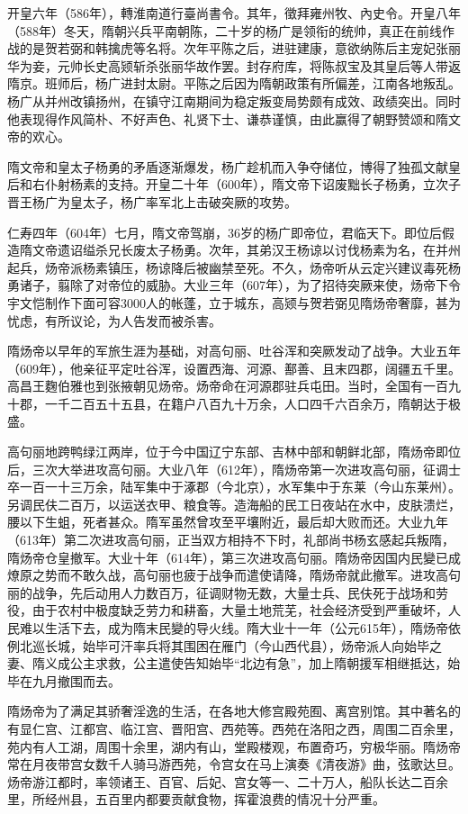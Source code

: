 开皇六年（586年），轉淮南道行臺尚書令。其年，徵拜雍州牧、內史令。开皇八年（588年）冬天，隋朝兴兵平南朝陈，二十岁的杨广是领衔的统帅，真正在前线作战的是贺若弼和韩擒虎等名将。次年平陈之后，进驻建康，意欲纳陈后主宠妃张丽华为妾，元帅长史高颎斩杀张丽华故作罢。封存府库，将陈叔宝及其皇后等人带返隋京。班师后，杨广进封太尉。平陈之后因为隋朝政策有所偏差，江南各地叛乱。杨广从并州改镇扬州，在镇守江南期间为稳定叛变局势颇有成效、政绩突出。同时他表现得作风简朴、不好声色、礼贤下士、谦恭谨慎，由此赢得了朝野赞颂和隋文帝的欢心。

隋文帝和皇太子杨勇的矛盾逐渐爆发，杨广趁机而入争夺储位，博得了独孤文献皇后和右仆射杨素的支持。开皇二十年（600年），隋文帝下诏废黜长子杨勇，立次子晋王杨广为皇太子，杨广率军北上击破突厥的攻势。

仁寿四年（604年）七月，隋文帝驾崩，36岁的杨广即帝位，君临天下。即位后假造隋文帝遗诏缢杀兄长废太子杨勇。次年，其弟汉王杨谅以讨伐杨素为名，在并州起兵，炀帝派杨素镇压，杨谅降后被幽禁至死。不久，炀帝听从云定兴建议毒死杨勇诸子，翦除了对帝位的威胁。大业三年（607年），为了招待突厥来使，炀帝下令宇文恺制作下面可容3000人的帐蓬，立于城东，高颎与贺若弼见隋炀帝奢靡，甚为忧虑，有所议论，为人告发而被杀害。

隋炀帝以早年的军旅生涯为基础，对高句丽、吐谷浑和突厥发动了战争。大业五年（609年），他亲征平定吐谷浑，设置西海、河源、鄯善、且末四郡，阔疆五千里。高昌王麴伯雅也到张掖朝见炀帝。炀帝命在河源郡驻兵屯田。当时，全国有一百九十郡，一千二百五十五县，在籍户八百九十万余，人口四千六百余万，隋朝达于极盛。

高句丽地跨鸭绿江两岸，位于今中国辽宁东部、吉林中部和朝鲜北部，隋炀帝即位后，三次大举进攻高句丽。大业八年（612年），隋炀帝第一次进攻高句丽，征调士卒一百一十三万余，陆军集中于涿郡（今北京），水军集中于东莱（今山东莱州）。另调民伕二百万，以运送衣甲、粮食等。造海船的民工日夜站在水中，皮肤溃烂，腰以下生蛆，死者甚众。隋军虽然曾攻至平壤附近，最后却大败而还。大业九年（613年）第二次进攻高句丽，正当双方相持不下时，礼部尚书杨玄感起兵叛隋，隋炀帝仓皇撤军。大业十年（614年），第三次进攻高句丽。隋炀帝因国内民變已成燎原之势而不敢久战，高句丽也疲于战争而遣使请降，隋炀帝就此撤军。进攻高句丽的战争，先后动用人力数百万，征调财物无数，大量士兵、民伕死于战场和劳役，由于农村中极度缺乏劳力和耕畜，大量土地荒芜，社会经济受到严重破坏，人民难以生活下去，成为隋末民變的导火线。隋大业十一年（公元615年），隋炀帝依例北巡长城，始毕可汗率兵将其围困在雁门（今山西代县），炀帝派人向始毕之妻、隋义成公主求救，公主遣使告知始毕“北边有急”，加上隋朝援军相继抵达，始毕在九月撤围而去。

隋炀帝为了满足其骄奢淫逸的生活，在各地大修宫殿苑囿、离宫别馆。其中著名的有显仁宫、江都宫、临江宫、晋阳宫、西苑等。西苑在洛阳之西，周围二百余里，苑内有人工湖，周围十余里，湖内有山，堂殿楼观，布置奇巧，穷极华丽。隋炀帝常在月夜带宫女数千人骑马游西苑，令宫女在马上演奏《清夜游》曲，弦歌达旦。炀帝游江都时，率领诸王、百官、后妃、宫女等一、二十万人，船队长达二百余里，所经州县，五百里内都要贡献食物，挥霍浪费的情况十分严重。

